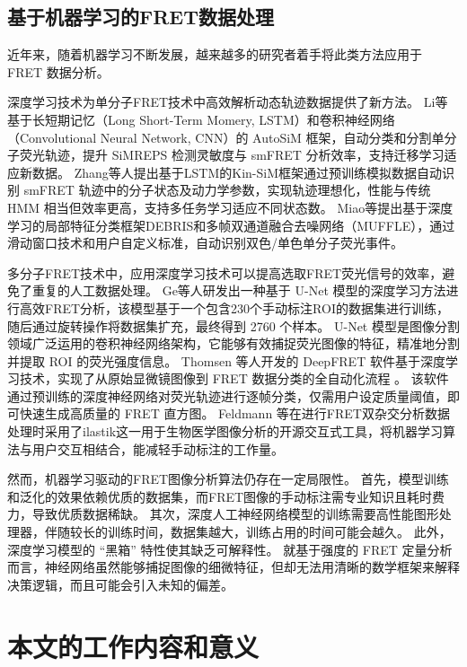 \subsection{基于机器学习的FRET数据处理}
近年来，随着机器学习不断发展，越来越多的研究者着手将此类方法应用于 FRET 数据分析。

深度学习技术为单分子FRET技术中高效解析动态轨迹数据提供了新方法。
Li等基于长短期记忆（Long Short-Term Momery, LSTM）和卷积神经网络（Convolutional Neural Network, CNN）的 AutoSiM 框架，自动分类和分割单分子荧光轨迹，提升 SiMREPS 检测灵敏度与 smFRET 分析效率，支持迁移学习适应新数据。
Zhang等人提出基于LSTM的Kin-SiM框架通过预训练模拟数据自动识别 smFRET 轨迹中的分子状态及动力学参数，实现轨迹理想化，性能与传统 HMM 相当但效率更高，支持多任务学习适应不同状态数。
Miao等提出基于深度学习的局部特征分类框架DEBRIS和多帧双通道融合去噪网络（MUFFLE），通过滑动窗口技术和用户自定义标准，自动识别双色/单色单分子荧光事件。

多分子FRET技术中，应用深度学习技术可以提高选取FRET荧光信号的效率，避免了重复的人工数据处理。
Ge等人研发出一种基于 U-Net 模型的深度学习方法进行高效FRET分析，该模型基于一个包含230个手动标注ROI的数据集进行训练，随后通过旋转操作将数据集扩充，最终得到 2760 个样本。
U-Net 模型是图像分割领域广泛运用的卷积神经网络架构，它能够有效捕捉荧光图像的特征，精准地分割并提取 ROI 的荧光强度信息。
Thomsen 等人开发的 DeepFRET 软件基于深度学习技术，实现了从原始显微镜图像到 FRET 数据分类的全自动化流程 。
该软件通过预训练的深度神经网络对荧光轨迹进行逐帧分类，仅需用户设定质量阈值，即可快速生成高质量的 FRET 直方图。
Feldmann 等在进行FRET双杂交分析数据处理时采用了ilastik这一用于生物医学图像分析的开源交互式工具，将机器学习算法与用户交互相结合，能减轻手动标注的工作量。

然而，机器学习驱动的FRET图像分析算法仍存在一定局限性。
首先，模型训练和泛化的效果依赖优质的数据集，而FRET图像的手动标注需专业知识且耗时费力，导致优质数据稀缺。
其次，深度人工神经网络模型的训练需要高性能图形处理器，伴随较长的训练时间，数据集越大，训练占用的时间可能会越久。
此外，深度学习模型的 “黑箱” 特性使其缺乏可解释性。
就基于强度的 FRET 定量分析而言，神经网络虽然能够捕捉图像的细微特征，但却无法用清晰的数学框架来解释决策逻辑，而且可能会引入未知的偏差。

\section{本文的工作内容和意义}

